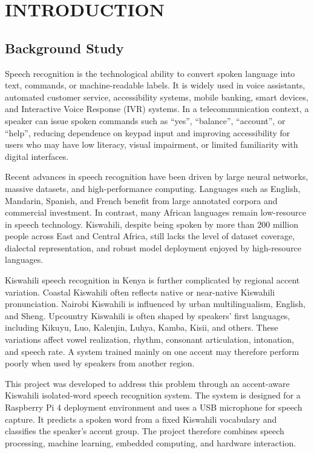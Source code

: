 \documentclass[12pt,a4paper]{report}
\begin{document}
\clearpage
{}

\chapter{INTRODUCTION}

\section{Background Study}
Speech recognition is the technological ability to convert spoken language into text, commands, or machine-readable labels. It is widely used in voice assistants, automated customer service, accessibility systems, mobile banking, smart devices, and Interactive Voice Response (IVR) systems. In a telecommunication context, a speaker can issue spoken commands such as ``yes'', ``balance'', ``account'', or ``help'', reducing dependence on keypad input and improving accessibility for users who may have low literacy, visual impairment, or limited familiarity with digital interfaces.

Recent advances in speech recognition have been driven by large neural networks, massive datasets, and high-performance computing. Languages such as English, Mandarin, Spanish, and French benefit from large annotated corpora and commercial investment. In contrast, many African languages remain low-resource in speech technology. Kiswahili, despite being spoken by more than 200 million people across East and Central Africa, still lacks the level of dataset coverage, dialectal representation, and robust model deployment enjoyed by high-resource languages.

Kiswahili speech recognition in Kenya is further complicated by regional accent variation. Coastal Kiswahili often reflects native or near-native Kiswahili pronunciation. Nairobi Kiswahili is influenced by urban multilingualism, English, and Sheng. Upcountry Kiswahili is often shaped by speakers' first languages, including Kikuyu, Luo, Kalenjin, Luhya, Kamba, Kisii, and others. These variations affect vowel realization, rhythm, consonant articulation, intonation, and speech rate. A system trained mainly on one accent may therefore perform poorly when used by speakers from another region.

This project was developed to address this problem through an accent-aware Kiswahili isolated-word speech recognition system. The system is designed for a Raspberry Pi 4 deployment environment and uses a USB microphone for speech capture. It predicts a spoken word from a fixed Kiswahili vocabulary and classifies the speaker's accent group. The project therefore combines speech processing, machine learning, embedded computing, and hardware interaction.
\end{document}
